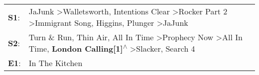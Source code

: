 \begin{supertabular}{p{0.03\textwidth}p{0.92\textwidth}}
 \textbf{S1}:  &           JaJunk\textsuperscript{} \textgreater \enspace Walletsworth\textsuperscript{}, \enspace Intentions Clear\textsuperscript{} \textgreater \enspace Rocker Part 2\textsuperscript{} \textgreater \enspace Immigrant Song\textsuperscript{}, \enspace Higgins\textsuperscript{}, \enspace Plunger\textsuperscript{} \textgreater \enspace JaJunk\textsuperscript{}  \enspace  \\
 \textbf{S2}:  &  Turn \& Run\textsuperscript{}, \enspace Thin Air\textsuperscript{}, \enspace All In Time\textsuperscript{} \textgreater \enspace Prophecy Now\textsuperscript{} \textgreater \enspace All In Time\textsuperscript{}, \enspace \textbf{London Calling[1]\textsuperscript{$\wedge$}} \textgreater \enspace Slacker\textsuperscript{}, \enspace Search 4\textsuperscript{}  \enspace  \\
 \textbf{E1}:  &                                                                                                                                                                                                                                                                                                                                         In The Kitchen\textsuperscript{}  \enspace  \\
\end{supertabular}
